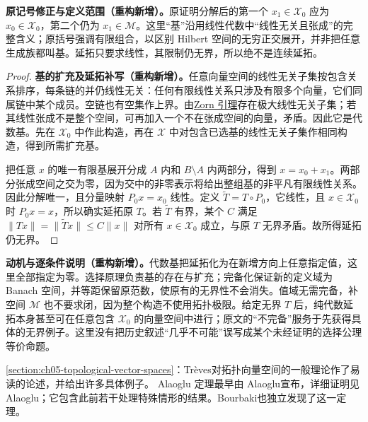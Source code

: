 \documentclass[../../main.tex]{subfiles}
\begin{document}
\begin{remark}
\textbf{原记号修正与定义范围（重构新增）。}原证明分解后的第一个 $x_1\in\mathscr X_0$ 应为 $x_0\in\mathscr X_0$，第二个仍为 $x_1\in\mathscr M$。这里“基”沿用线性代数中“线性无关且张成”的完整含义；原括号强调有限组合，以区别 Hilbert 空间的无穷正交展开，并非把任意生成族都叫基。延拓只要求线性，其限制仍无界，所以绝不是连续延拓。
\end{remark}
\begin{proof}
\textbf{基的扩充及延拓补写（重构新增）。}任意向量空间的线性无关子集按包含关系排序，每条链的并仍线性无关：任何有限线性关系只涉及有限多个向量，它们同属链中某个成员。空链也有空集作上界。由\hyperref[lemma:ch00-zorn]{Zorn 引理}存在极大线性无关子集；若其线性张成不是整个空间，可再加入一个不在张成空间的向量，矛盾。因此它是代数基。先在 $\mathscr X_0$ 中作此构造，再在 $\mathscr X$ 中对包含已选基的线性无关子集作相同构造，得到所需扩充基。

把任意 $x$ 的唯一有限基展开分成 $A$ 内和 $B\setminus A$ 内两部分，得到 $x=x_0+x_1$。两部分张成空间之交为零，因为交中的非零表示将给出整组基的非平凡有限线性关系。因此分解唯一，且分量映射 $P_0x=x_0$ 线性。定义 $\widetilde T=T\circ P_0$，它线性，且 $x\in\mathscr X_0$ 时 $P_0x=x$，所以确实延拓原 $T$。若 $\widetilde T$ 有界，某个 $C$ 满足 $\|Tx\|=\|\widetilde Tx\|\leqslant C\|x\|$ 对所有 $x\in\mathscr X_0$ 成立，与原 $T$ 无界矛盾。故所得延拓仍无界。
\end{proof}
\begin{remark}
\textbf{动机与逐条件说明（重构新增）。}代数基把延拓化为在新增方向上任意指定值，这里全部指定为零。选择原理负责基的存在与扩充；完备化保证新的定义域为 Banach 空间，并等距保留原范数，使原有的无界性不会消失。值域无需完备，补空间 $\mathscr M$ 也不要求闭，因为整个构造不使用拓扑极限。给定无界 $T$ 后，纯代数延拓本身甚至可在任意包含 $\mathscr X_0$ 的向量空间中进行；原文的“不完备”服务于先获得具体的无界例子。这里没有把历史叙述“几乎不可能”误写成某个未经证明的选择公理等价命题。
\end{remark}
\cref{section:ch05-topological-vector-spaces}：Trèves\cite{folland-bib-150}对拓扑向量空间的一般理论作了易读的论述，并给出许多具体例子。
Alaoglu 定理最早由 Alaoglu\cite{folland-bib-003}宣布，详细证明见 Alaoglu\cite{folland-bib-004}；它包含此前若干处理特殊情形的结果。Bourbaki\cite{folland-bib-019}也独立发现了这一定理。
\end{document}
